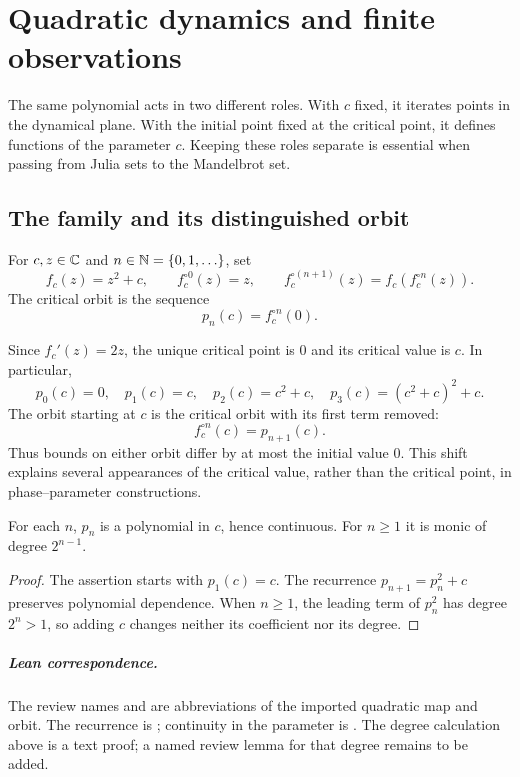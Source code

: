 \chapter{Quadratic dynamics and finite observations}
\label{ch:quadratic-foundations}
\label{chap:quadratic-foundations}

The same polynomial acts in two different roles.  With $c$ fixed, it
iterates points in the dynamical plane.  With the initial point fixed at
the critical point, it defines functions of the parameter $c$.  Keeping
these roles separate is essential when passing from Julia sets to the
Mandelbrot set.

\section{The family and its distinguished orbit}

\begin{definition}
\label{def:quadratic-family}
For $c,z\in\mathbb C$ and $n\in\mathbb N=\{0,1,\ldots\}$, set
\[
 f_c(z)=z^2+c,\qquad
 f_c^{\circ0}(z)=z,\qquad
 f_c^{\circ(n+1)}(z)=f_c(f_c^{\circ n}(z)).
\]
The critical orbit is the sequence
\[
 p_n(c)=f_c^{\circ n}(0).
\]
\end{definition}

Since $f_c'(z)=2z$, the unique critical point is $0$ and its critical
value is $c$.  In particular,
\[
 p_0(c)=0,\quad p_1(c)=c,\quad
 p_2(c)=c^2+c,\quad p_3(c)=(c^2+c)^2+c.
\]
The orbit starting at $c$ is the critical orbit with its first term
removed:
\[
 f_c^{\circ n}(c)=p_{n+1}(c).
\]
Thus bounds on either orbit differ by at most the initial value $0$.
This shift explains several appearances of the critical value, rather
than the critical point, in phase--parameter constructions.

\begin{lemma}
\label{lem:orbit-polynomial}
For each $n$, $p_n$ is a polynomial in $c$, hence continuous.  For $n\ge1$
it is monic of degree $2^{n-1}$.
\end{lemma}

\begin{proof}
The assertion starts with $p_1(c)=c$.  The recurrence
$p_{n+1}=p_n^2+c$ preserves polynomial dependence.  When $n\ge1$,
the leading term of $p_n^2$ has degree $2^n>1$, so adding $c$ changes
neither its coefficient nor its degree.
\end{proof}

\paragraph{Lean correspondence.}
The review names
 and
are abbreviations of the imported quadratic map and orbit.  The recurrence
is ; continuity in the parameter is
.  The degree calculation above is a
text proof; a named review lemma for that degree remains to be added.

